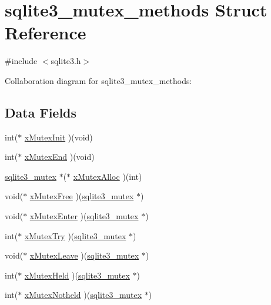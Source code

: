 \hypertarget{structsqlite3__mutex__methods}{}\section{sqlite3\+\_\+mutex\+\_\+methods Struct Reference}
\label{structsqlite3__mutex__methods}


{\ttfamily \#include $<$sqlite3.\+h$>$}



Collaboration diagram for sqlite3\+\_\+mutex\+\_\+methods\+:
\subsection*{Data Fields}
\begin{DoxyCompactItemize}
\item 
int($\ast$ \hyperlink{structsqlite3__mutex__methods_aca650adcfdb8f1558549b53df3a90544}{x\+Mutex\+Init} )(void)
\item 
int($\ast$ \hyperlink{structsqlite3__mutex__methods_ac92c39796f740decb37d5b6040f7eece}{x\+Mutex\+End} )(void)
\item 
\hyperlink{structsqlite3__mutex}{sqlite3\+\_\+mutex} $\ast$($\ast$ \hyperlink{structsqlite3__mutex__methods_aff1d38bb0f2150fdf62ff87c241bd76e}{x\+Mutex\+Alloc} )(int)
\item 
void($\ast$ \hyperlink{structsqlite3__mutex__methods_a926165ded3bd55b79919e25404263d5c}{x\+Mutex\+Free} )(\hyperlink{structsqlite3__mutex}{sqlite3\+\_\+mutex} $\ast$)
\item 
void($\ast$ \hyperlink{structsqlite3__mutex__methods_a7d4855948658b13b5f171b63f485a1aa}{x\+Mutex\+Enter} )(\hyperlink{structsqlite3__mutex}{sqlite3\+\_\+mutex} $\ast$)
\item 
int($\ast$ \hyperlink{structsqlite3__mutex__methods_af739cd32a41c65eb92aa0dbcf22cdfc7}{x\+Mutex\+Try} )(\hyperlink{structsqlite3__mutex}{sqlite3\+\_\+mutex} $\ast$)
\item 
void($\ast$ \hyperlink{structsqlite3__mutex__methods_a8f5dbd79462481b7b67b619528812561}{x\+Mutex\+Leave} )(\hyperlink{structsqlite3__mutex}{sqlite3\+\_\+mutex} $\ast$)
\item 
int($\ast$ \hyperlink{structsqlite3__mutex__methods_abfbaad1736d82afa5b689d754b17196b}{x\+Mutex\+Held} )(\hyperlink{structsqlite3__mutex}{sqlite3\+\_\+mutex} $\ast$)
\item 
int($\ast$ \hyperlink{structsqlite3__mutex__methods_a37187ad856ffb0ddb9c8d8d63b681025}{x\+Mutex\+Notheld} )(\hyperlink{structsqlite3__mutex}{sqlite3\+\_\+mutex} $\ast$)
\end{DoxyCompactItemize}


